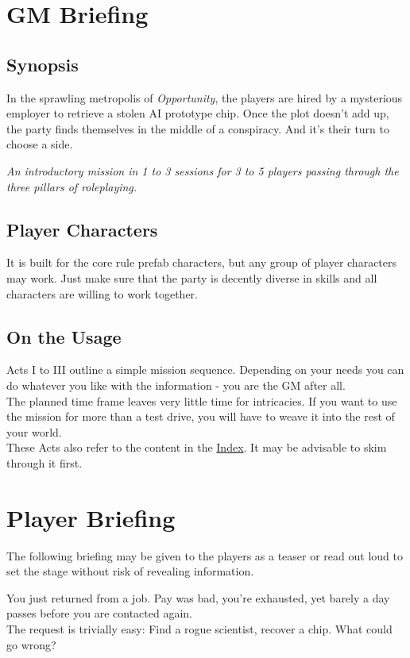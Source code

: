 \chapter{GM Briefing}
\section{Synopsis}
In the sprawling metropolis of \emph{Opportunity},
	the players are hired by a mysterious employer to retrieve a stolen AI prototype chip.
Once the plot doesn't add up,
	the party finds themselves in the middle of a conspiracy.
And it's their turn to choose a side.
\par
{
	\itshape
	An introductory mission
	in 1 to 3 sessions
	for 3 to 5 players
	passing through the three pillars of roleplaying.
}
\section{Player Characters}
It is built for the core rule prefab characters,
but any group of player characters may work.
Just make sure that the party is decently diverse in skills
and all characters are willing to work together.
\section{On the Usage}
Acts I to III outline a simple mission sequence.
Depending on your needs you can do whatever you like with the information
	- you are the GM after all.
\\%
The planned time frame leaves very little time for intricacies.
If you want to use the mission for more than a test drive,
	you will have to weave it into the rest of your world.
\\%
These Acts also refer to the content in the \hyperref[ch:index]{Index}.
It may be advisable to skim through it first.

\chapter{Player Briefing}
\begin{exampleblock}
	The following briefing may be given to the players as a teaser
		or read out loud to set the stage
		without risk of revealing information.
\end{exampleblock}
You just returned from a job.
Pay was bad, you're exhausted,
yet barely a day passes before you are contacted again.
\\%
The request is trivially easy:
Find a rogue scientist, recover a chip.
What could go wrong?

